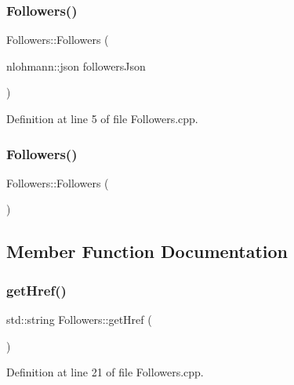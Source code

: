 \subsubsection{\texorpdfstring{Followers()}{Followers()}\hspace{0.1cm}{\footnotesize\ttfamily [1/2]}}
{\footnotesize\ttfamily Followers\+::\+Followers (\begin{DoxyParamCaption}\item[{nlohmann\+::json}]{followers\+Json }\end{DoxyParamCaption})}



Definition at line 5 of file Followers.\+cpp.

\mbox{\label{class_followers_a6cba6b1748e64b3608991b650ab375b7}} 
\subsubsection{\texorpdfstring{Followers()}{Followers()}\hspace{0.1cm}{\footnotesize\ttfamily [2/2]}}
{\footnotesize\ttfamily Followers\+::\+Followers (\begin{DoxyParamCaption}{ }\end{DoxyParamCaption})\hspace{0.3cm}{\ttfamily [default]}}



\subsection{Member Function Documentation}
\mbox{\label{class_followers_a64d6f70d929f285866df9d3f439d954d}} 
\subsubsection{\texorpdfstring{get\+Href()}{getHref()}}
{\footnotesize\ttfamily std\+::string Followers\+::get\+Href (\begin{DoxyParamCaption}{ }\end{DoxyParamCaption})}



Definition at line 21 of file Followers.\+cpp.

